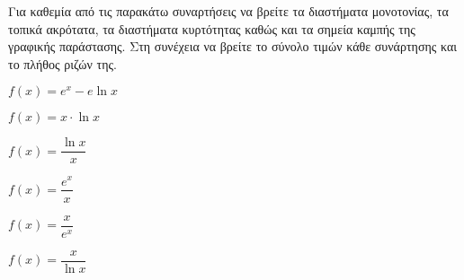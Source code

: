 Για καθεμία από τις παρακάτω συναρτήσεις να βρείτε τα διαστήματα μονοτονίας, τα τοπικά ακρότατα, τα διαστήματα κυρτότητας καθώς και τα σημεία καμπής της γραφικής παράστασης. Στη συνέχεια να βρείτε το σύνολο τιμών κάθε συνάρτησης και το πλήθος ριζών της.
\begin{alist}
\item $ f(x)=e^x-e\ln{x} $
\item $ f(x)=x\cdot\ln{x} $
\item $ f(x)=\dfrac{\ln{x}}{x} $
\item $ f(x)=\dfrac{e^x}{x} $
\item $ f(x)=\dfrac{x}{e^x} $
\item $ f(x)=\dfrac{x}{\ln{x}} $
\end{alist}
